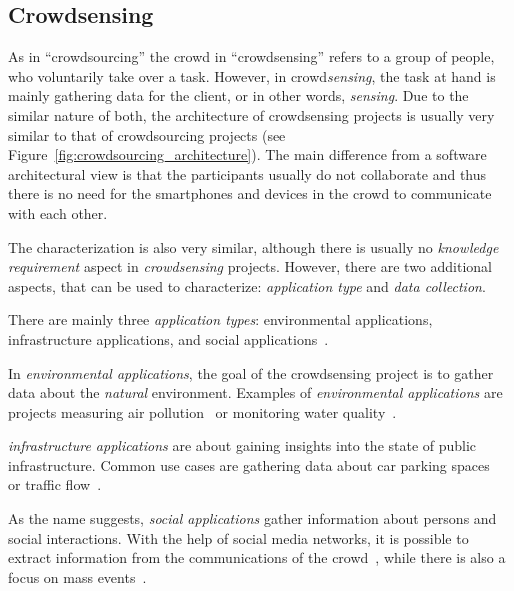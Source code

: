 \subsection*{Crowdsensing}
As in ``crowdsourcing'' the crowd in ``crowdsensing'' refers to a group of people, who voluntarily take over a task.
However, in crowd\textit{sensing}, the task at hand is mainly gathering data for the client, or in other words, \textit{sensing}.
Due to the similar nature of both, the architecture of crowdsensing projects is usually very similar to that of crowdsourcing projects (see Figure~\ref{fig:crowdsourcing_architecture}).
The main difference from a software architectural view is that the participants usually do not collaborate and thus there is no need for the smartphones and devices in the crowd to communicate with each other.

The characterization is also very similar, although there is usually no \textit{knowledge requirement} aspect in \textit{crowdsensing} projects.
However, there are two additional aspects, that can be used to characterize: \textit{application type} and \textit{data collection}.

There are mainly three \textit{application types}: environmental applications, infrastructure applications, and social applications~\cite{ganti2011mobile}.

In \textit{environmental applications}, the goal of the crowdsensing project is to gather data about the \textit{natural} environment.
Examples of \textit{environmental applications} are projects measuring air pollution~\cite{hasenfratz2012participatory,sivaraman2013hazewatch,liu2018third} or monitoring water quality~\cite{minkman2015citizen,rapousis2016performance,shang2023crowdwatersens}.

\textit{infrastructure applications} are about gaining insights into the state of public infrastructure.
Common use cases are gathering data about car parking spaces~\cite{villanueva2015crowdsensing,coric2013crowdsensing,rinne2014mobile} or traffic flow~\cite{wang2018city,li2019privacy,mei2020towards}.

As the name suggests, \textit{social applications} gather information about persons and social interactions.
With the help of social media networks, it is possible to extract information from the communications of the crowd~\cite{grasso2017public,cecilia2020mobile,phan2019drinks}, while there is also a focus on mass events~\cite{rahman2017location,cardone2014crowdsensing,jarvis2013ubicomp}.

